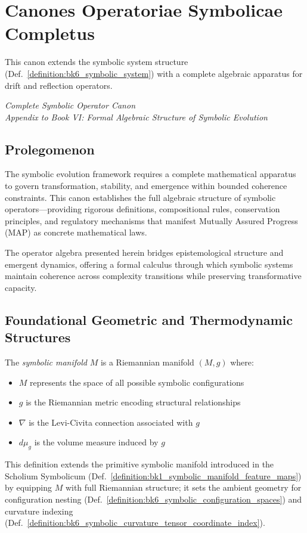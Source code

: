 \section{Canones Operatoriae Symbolicae Completus}
\label{sec:bk6_canones_operatoriae_symbolicae_completus}

This canon extends the symbolic system structure (Def.~\ref{definition:bk6_symbolic_system}) with a complete algebraic apparatus for drift and reflection operators.
\begin{center}
\textit{Complete Symbolic Operator Canon}\\
\textit{Appendix to Book VI: Formal Algebraic Structure of Symbolic Evolution}
\end{center}

\subsection*{Prolegomenon}
\label{subsec:bk6_prolegomenon_completus}
The symbolic evolution framework requires a complete mathematical apparatus to govern transformation, stability, and emergence within bounded coherence constraints. This canon establishes the full algebraic structure of symbolic operators—providing rigorous definitions, compositional rules, conservation principles, and regulatory mechanisms that manifest Mutually Assured Progress (MAP) as concrete mathematical laws.

The operator algebra presented herein bridges epistemological structure and emergent dynamics, offering a formal calculus through which symbolic systems maintain coherence across complexity transitions while preserving transformative capacity.

\subsection{Foundational Geometric and Thermodynamic Structures}
\label{subsec:bk6_foundational_geometric_thermodynamic_structures}

\begin{definition}
\label{definition:bk6_symbolic_manifold_structure}
The \emph{symbolic manifold} $M$ is a Riemannian manifold $(M, g)$ where:
\begin{itemize}
\item $M$ represents the space of all possible symbolic configurations
\item $g$ is the Riemannian metric encoding structural relationships
\item $\nabla$ is the Levi-Civita connection associated with $g$
\item $d\mu_g$ is the volume measure induced by $g$
\end{itemize}
This definition extends the primitive symbolic manifold introduced in the Scholium Symbolicum (Def.~\ref{definition:bk1_symbolic_manifold_feature_maps}) by equipping $M$ with full Riemannian structure; it sets the ambient geometry for configuration nesting (Def.~\ref{definition:bk6_symbolic_configuration_spaces}) and curvature indexing (Def.~\ref{definition:bk6_symbolic_curvature_tensor_coordinate_index}).
\end{definition}

